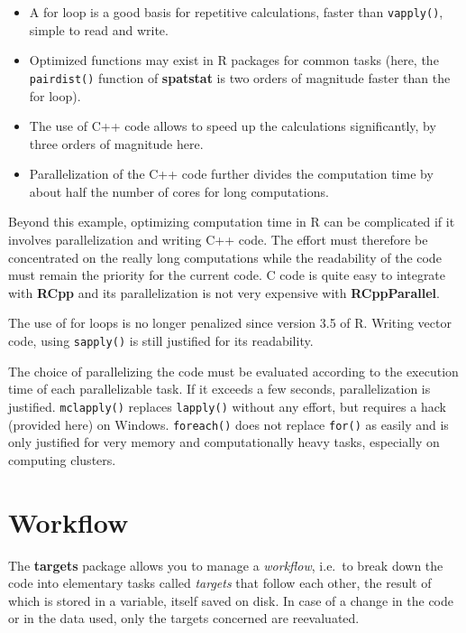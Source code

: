 \documentclass[
  12pt,
  american,
  a4paper,
  extrafontsizes,onecolumn,openright
  ]{memoir}
\providecommand{\tightlist}{%
  \setlength{\itemsep}{0pt}\setlength{\parskip}{0pt}}
\begin{document}
\begin{itemize}
\tightlist
\item
  A for loop is a good basis for repetitive calculations, faster than \texttt{vapply()}, simple to read and write.
\item
  Optimized functions may exist in R packages for common tasks (here, the \texttt{pairdist()} function of \textbf{spatstat} is two orders of magnitude faster than the for loop).
\item
  The use of C++ code allows to speed up the calculations significantly, by three orders of magnitude here.
\item
  Parallelization of the C++ code further divides the computation time by about half the number of cores for long computations.
\end{itemize}

Beyond this example, optimizing computation time in R can be complicated if it involves parallelization and writing C++ code.
The effort must therefore be concentrated on the really long computations while the readability of the code must remain the priority for the current code.
C code is quite easy to integrate with \textbf{RCpp} and its parallelization is not very expensive with \textbf{RCppParallel}.

The use of for loops is no longer penalized since version 3.5 of R.
Writing vector code, using \texttt{sapply()} is still justified for its readability.

The choice of parallelizing the code must be evaluated according to the execution time of each parallelizable task.
If it exceeds a few seconds, parallelization is justified.
\texttt{mclapply()} replaces \texttt{lapply()} without any effort, but requires a hack (provided here) on Windows.
\texttt{foreach()} does not replace \texttt{for()} as easily and is only justified for very memory and computationally heavy tasks, especially on computing clusters.

\hypertarget{sec:targets}{%
\section{Workflow}\label{sec:targets}}

The \textbf{targets} package allows you to manage a \emph{workflow}, i.e.~to break down the code into elementary tasks called \emph{targets} that follow each other, the result of which is stored in a variable, itself saved on disk.
In case of a change in the code or in the data used, only the targets concerned are reevaluated.
\end{document}
